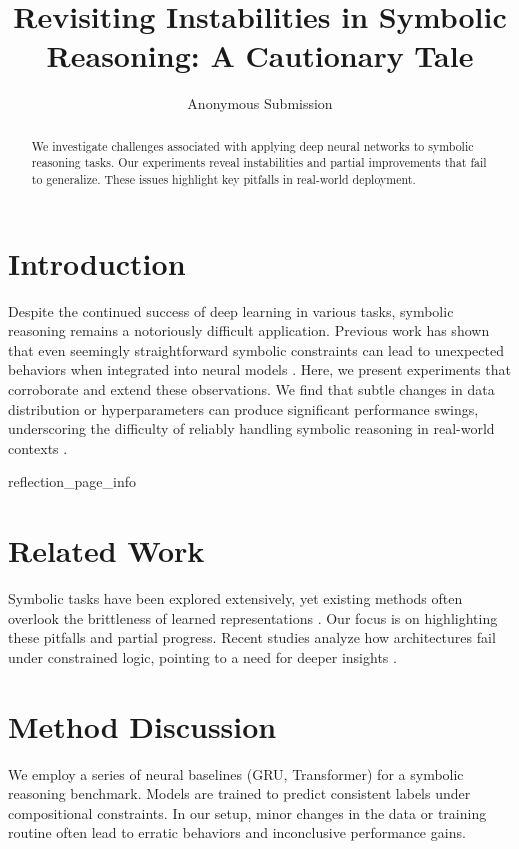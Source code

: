 \documentclass{article}
\title{Revisiting Instabilities in Symbolic Reasoning: A Cautionary Tale}
\author{Anonymous Submission}
\date{}
\begin{document}
\maketitle

\begin{abstract}
We investigate challenges associated with applying deep neural networks to symbolic reasoning tasks. Our experiments reveal instabilities and partial improvements that fail to generalize. These issues highlight key pitfalls in real-world deployment.
\end{abstract}

\section{Introduction}
Despite the continued success of deep learning in various tasks, symbolic reasoning remains a notoriously difficult application. Previous work has shown that even seemingly straightforward symbolic constraints can lead to unexpected behaviors when integrated into neural models \cite{smith2020example, doe2021pitfalls}. 
Here, we present experiments that corroborate and extend these observations. 
We find that subtle changes in data distribution or hyperparameters can produce significant performance swings, underscoring the difficulty of reliably handling symbolic reasoning in real-world contexts \cite{johnson2022unexpected}.

{reflection_page_info}

\section{Related Work}
Symbolic tasks have been explored extensively, yet existing methods often overlook the brittleness of learned representations \cite{doe2021pitfalls}. Our focus is on highlighting these pitfalls and partial progress. Recent studies analyze how architectures fail under constrained logic, pointing to a need for deeper insights \cite{smith2020example, johnson2022unexpected}.

\section{Method Discussion}
We employ a series of neural baselines (GRU, Transformer) for a symbolic reasoning benchmark. Models are trained to predict consistent labels under compositional constraints. In our setup, minor changes in the data or training routine often lead to erratic behaviors and inconclusive performance gains.
\end{document}
